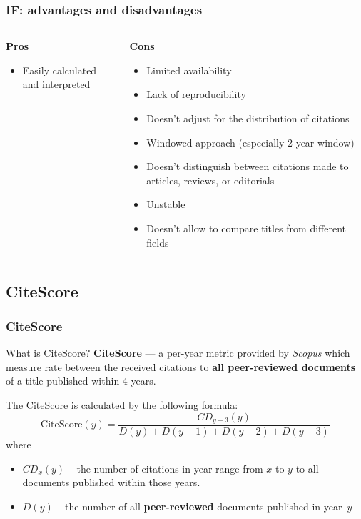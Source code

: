 \documentclass{beamer}
\newcommand{\pros}{\item[{\textcolor[HTML]{3C8031}{\ding{51}}}]}
\newcommand{\cons}{\item[\textcolor{red}{\ding{54}}]}
\newcommand{\sco}{\textit{Scopus} }
\begin{document}
\begin{frame}
    \frametitle{IF: advantages and disadvantages}
    \begin{columns}[T]
        \begin{column}{.5\textwidth}
            \centering \textbf{Pros}
            \begin{itemize}[<+->]
                \pros Easily calculated and interpreted
            \end{itemize}
        \end{column}
        \begin{column}{.5\textwidth}
            \centering \textbf{Cons}
            \begin{itemize}[<+->]
                \cons Limited availability
                \cons Lack of reproducibility
                \cons Doesn’t adjust for the distribution of citations
                \cons Windowed approach (especially 2 year window)
                \cons Doesn’t distinguish between citations made to articles, reviews, or editorials
                \cons Unstable
                \cons Doesn't allow to compare titles from different fields
            \end{itemize}
        \end{column}
    \end{columns}
\end{frame}

\subsection{CiteScore}
\begin{frame}
    \frametitle{CiteScore}
    \begin{block}{What is CiteScore?}
        \textbf{CiteScore}\cite{CiteScore2016} --- a per-year metric provided
        by \sco which measure rate between the received citations
        to \textbf{all peer-reviewed documents} of a title published within 4 years.
    \end{block}

    The CiteScore is calculated by the following formula:
    \[
        \text{CiteScore}(y) = \frac{CD_{y-3}(y)}
        {D(y) + D(y-1) + D(y-2) + D(y-3)}
    \]
    where
    \begin{itemize}
        \item $CD_x(y)$ -- the number of citations in year range from $x$ to $y$
              to all documents published within those years.
        \item $D(y)$ -- the number of all \textbf{peer-reviewed} documents published in year~$y$
    \end{itemize}
\end{frame}
\end{document}
